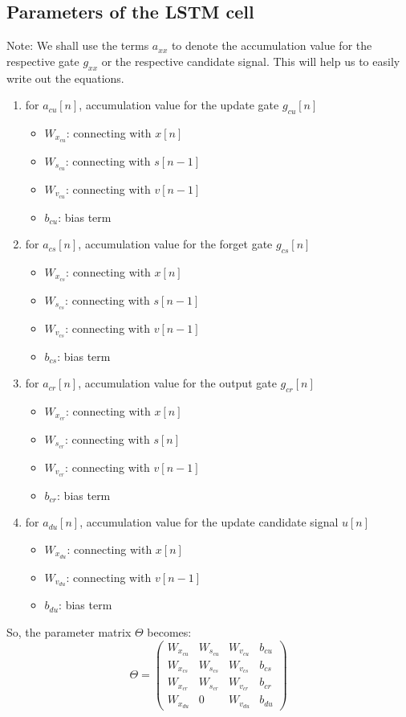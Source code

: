 \documentclass[12pt,a4paper]{article}
\begin{document}
{\subsection{Parameters of the LSTM cell}
Note: We shall use the terms $a_{xx}$ to denote the accumulation value for the respective gate $g_{xx}$ or the respective candidate signal. This will help us to easily write out the equations.
\begin{enumerate}
    \item for $a_{cu}[n]$, accumulation value for the update gate $g_{cu}[n]$
    \begin{itemize}
        \item $W_{x_{cu}}$: connecting with $x[n]$ 
        \item $W_{s_{cu}}$: connecting with $s[n-1]$
        \item $W_{v_{cu}}$: connecting with $v[n-1]$
        \item $b_{cu}$:   bias term
    \end{itemize}
    \item for $a_{cs}[n]$, accumulation value for the forget gate $g_{cs}[n]$
    \begin{itemize}
        \item $W_{x_{cs}}$: connecting with $x[n]$ 
        \item $W_{s_{cs}}$: connecting with $s[n-1]$
        \item $W_{v_{cs}}$: connecting with $v[n-1]$
        \item $b_{cs}$:   bias term
    \end{itemize}
    \item for $a_{cr}[n]$, accumulation value for the output gate $g_{cr}[n]$
    \begin{itemize}
        \item $W_{x_{cr}}$: connecting with $x[n]$
        \item $W_{s_{cr}}$: connecting with $s[n]$
        \item $W_{v_{cr}}$: connecting with $v[n-1]$
        \item $b_{cr}$:   bias term
    \end{itemize}
    \item for $a_{du}[n]$, accumulation value for the update candidate signal $u[n]$
    \begin{itemize}
        \item $W_{x_{du}}$: connecting with $x[n]$
        \item $W_{v_{du}}$: connecting with $v[n-1]$
        \item $b_{du}$:   bias term
    \end{itemize}
\end{enumerate}
So, the parameter matrix $\Theta$ becomes:
\[
\Theta = \begin{pmatrix}
          W_{x_{cu}} & W_{s_{cu}} & W_{v_{cu}} & b_{cu}\\
          W_{x_{cs}} & W_{s_{cs}} & W_{v_{cs}} & b_{cs}\\
          W_{x_{cr}} & W_{s_{cr}} & W_{v_{cr}} & b_{cr}\\
          W_{x_{du}} & 0 & W_{v_{du}} & b_{du}
          \end{pmatrix}\tag{35}
\]
}
\end{document}
